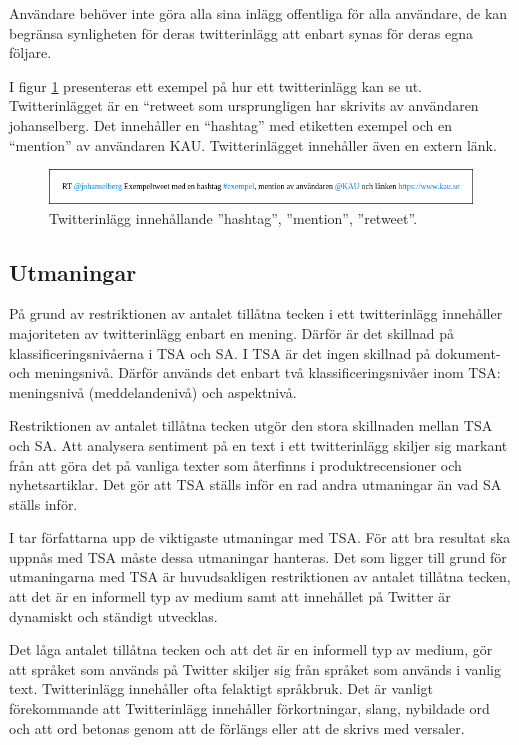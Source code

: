\documentclass{kaumasters} %
\begin{document}
Användare behöver inte göra alla sina inlägg offentliga för alla användare, de kan begränsa synligheten för deras twitterinlägg att enbart synas för deras egna följare. 

I figur \ref{fig:tweet} presenteras ett exempel på hur ett twitterinlägg kan se ut. Twitterinlägget är en “retweet som ursprungligen har skrivits av användaren johanselberg. Det innehåller en “hashtag” med etiketten exempel och en “mention” av användaren KAU. Twitterinlägget innehåller även en extern länk.

\begin{figure}[h]
\includegraphics[width=12cm]{exempeltweet}
\centering
\caption{Twitterinlägg innehållande ''hashtag'', ''mention'', ''retweet''.}
\label{fig:tweet}
\end{figure}

\subsection{Utmaningar} \label{TSAchall}
På grund av restriktionen av antalet tillåtna tecken i ett twitterinlägg innehåller majoriteten av twitterinlägg enbart en mening. Därför är det skillnad på klassificeringsnivåerna i TSA och SA. I TSA är det ingen skillnad på dokument- och meningsnivå. Därför används det enbart två klassificeringsnivåer inom TSA: meningsnivå (meddelandenivå) och aspektnivå. \cite{TSAsurvey}

Restriktionen av antalet tillåtna tecken utgör den stora skillnaden mellan TSA och SA. Att analysera sentiment på en text i ett twitterinlägg skiljer sig markant från att göra det på vanliga texter som återfinns i produktrecensioner och nyhetsartiklar. Det gör att TSA ställs inför en rad andra utmaningar än vad SA ställs inför.

I \cite{TSAsurvey} tar författarna upp de viktigaste utmaningar med TSA. För att bra resultat ska uppnås med TSA måste dessa utmaningar hanteras. Det som ligger till grund för utmaningarna med TSA är huvudsakligen restriktionen av antalet tillåtna tecken, att det är en informell typ av medium samt att innehållet på Twitter är dynamiskt och ständigt utvecklas.

Det låga antalet tillåtna tecken och att det är en informell typ av medium, gör att språket som används på Twitter skiljer sig från språket som används i vanlig text. Twitterinlägg innehåller ofta felaktigt språkbruk. Det är vanligt förekommande att Twitterinlägg innehåller förkortningar, slang,  nybildade ord och att ord betonas genom att de förlängs eller att de skrivs med versaler. 
\end{document}
